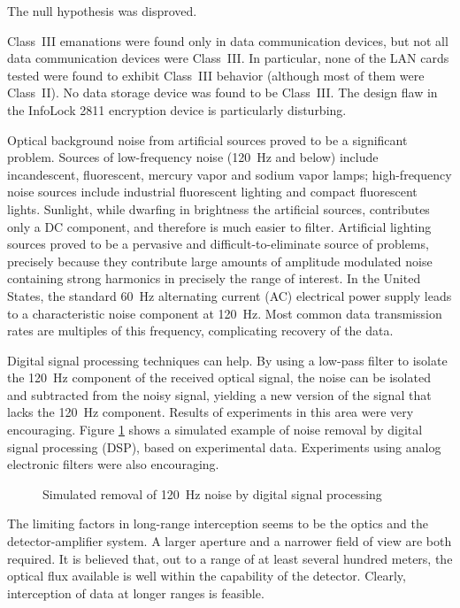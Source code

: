 \documentclass[twocolumn]{article}
\begin{document}
The null hypothesis was disproved.

Class~III emanations were found only in data communication devices, but not all data communication devices were Class~III.  In particular, none of the LAN cards tested were found to exhibit Class~III behavior (although most of them were Class~II).  No data storage device was found to be Class~III.  The design flaw in the InfoLock 2811 encryption device is particularly disturbing.

Optical background noise from artificial sources proved to be a significant problem.  Sources of low-frequency noise (120~Hz and below) include incandescent, fluorescent, mercury vapor and sodium vapor lamps; high-frequency noise sources include industrial fluorescent lighting and compact fluorescent lights.  Sunlight, while dwarfing in brightness the artificial sources, contributes only a DC component, and therefore is much easier to filter.  Artificial lighting sources proved to be a pervasive and difficult-to-eliminate source of problems, precisely because they contribute large amounts of amplitude modulated noise containing strong harmonics in precisely the range of interest.  In the United States, the standard 60~Hz alternating current (AC) electrical power supply leads to a characteristic noise component at 120~Hz.  Most common data transmission rates are multiples of this frequency, complicating recovery of the data.

Digital signal processing techniques can help.  By using a low-pass filter to isolate the 120~Hz component of the received optical signal, the noise can be isolated and subtracted from the noisy signal, yielding a new version of the signal that lacks the 120~Hz component.  Results of experiments in this area were very encouraging.  Figure \ref{noise_removal_figure} shows a simulated example of noise removal by digital signal processing (DSP), based on experimental data.  Experiments using analog electronic filters were also encouraging.

\begin{figure}[htbp]
\centerline{\epsfysize=1.5in }
\caption{Simulated removal of 120~Hz noise by digital signal processing}
\label{noise_removal_figure}
\end{figure}

The limiting factors in long-range interception seems to be the optics and the detector-amplifier system.  A larger aperture and a narrower field of view are both required.  It is believed that, out to a range of at least several hundred meters, the optical flux available is well within the capability of the detector.  Clearly, interception of data at longer ranges is feasible.
\end{document}
